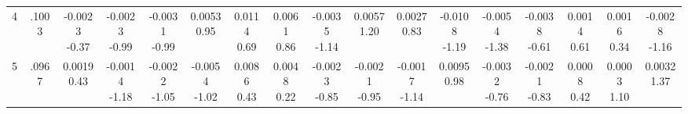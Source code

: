 \begin{landscape}
\begin{center}
{\begin{adjustbox}{max width=\textheight}
\begin{tabular}{lcccccccccccccccc}
4 & .1003 & \shortstack{-0.0023\\-0.37} & \shortstack{-0.0023\\-0.99} & \shortstack{-0.0031\\-0.99} & \shortstack{0.0053\\0.95} & \shortstack{0.0114\\0.69} & \shortstack{0.0061\\0.86} & \shortstack{-0.0035\\-1.14} & \shortstack{0.0057\\1.20} & \shortstack{0.0027\\0.83} & \shortstack{-0.0108\\-1.19} & \shortstack{-0.0054\\-1.38} & \shortstack{-0.0038\\-0.61} & \shortstack{0.0014\\0.61} & \shortstack{0.0016\\0.34} & \shortstack{-0.0028\\-1.16} \\
5 & .0967 & \shortstack{0.0019\\0.43} & \shortstack{-0.0014\\-1.18} & \shortstack{-0.0022\\-1.05} & \shortstack{-0.0054\\-1.02} & \shortstack{0.0086\\0.43} & \shortstack{0.0048\\0.22} & \shortstack{-0.0023\\-0.85} & \shortstack{-0.0021\\-0.95} & \shortstack{-0.0017\\-1.14} & \shortstack{0.0095\\0.98} & \shortstack{-0.0032\\-0.76} & \shortstack{-0.0021\\-0.83} & \shortstack{0.0008\\0.42} & \shortstack{0.0003\\1.10} & \shortstack{0.0032\\1.37} \\

\end{tabular}
\end{adjustbox}}
\end{center}
\end{landscape}
